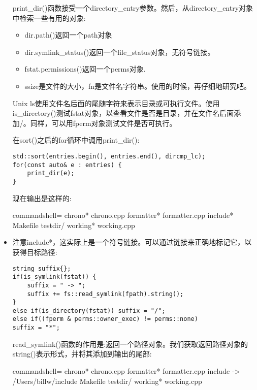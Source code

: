 \begin{itemize}
print\_dir()函数接受一个directory\_entry参数。然后，从directory\_entry对象中检索一些有用的对象:

\begin{itemize}
\item 
dir.path()返回一个path对象

\item 
dir.symlink\_status()返回一个file\_status对象，无符号链接。

\item 
fstat.permissions()返回一个perms对象.

\item 
ssize是文件的大小，fn是文件名字符串。使用的时候，再仔细地研究吧。
\end{itemize}

Unix ls使用文件名后面的尾随字符来表示目录或可执行文件。使用is\_directory()测试fstat对象，以查看文件是否是目录，并在文件名后面添加/。同样，可以用fperm对象测试文件是否可执行。

在sort()之后的for循环中调用print\_dir():

\begin{lstlisting}[style=styleCXX]
std::sort(entries.begin(), entries.end(), dircmp_lc);
for(const auto& e : entries) {
	print_dir(e);
}
\end{lstlisting}

现在输出是这样的:

\begin{tcblisting}{commandshell={}}
chrono*
chrono.cpp
formatter*
formatter.cpp
include*
Makefile
testdir/
working*
working.cpp
\end{tcblisting}

\item 
注意include*，这实际上是一个符号链接。可以通过链接来正确地标记它，以获得目标路径:

\begin{lstlisting}[style=styleCXX]
string suffix{};
if(is_symlink(fstat)) {
	suffix = " -> ";
	suffix += fs::read_symlink(fpath).string();
}
else if(is_directory(fstat)) suffix = "/";
else if((fperm & perms::owner_exec) != perms::none)
suffix = "*";
\end{lstlisting}

read\_symlink()函数的作用是:返回一个路径对象。我们获取返回路径对象的string()表示形式，并将其添加到输出的尾部:

\begin{tcblisting}{commandshell={}}
chrono*
chrono.cpp
formatter*
formatter.cpp
include -> /Users/billw/include
Makefile
testdir/
working*
working.cpp
\end{tcblisting}


\end{itemize}
